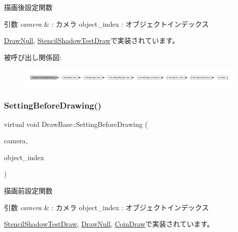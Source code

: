 描画後設定関数 


\begin{DoxyParams}{引数}
{\em camera} & \+: カメラ object\+\_\+index \+: オブジェクトインデックス \\
\hline
\end{DoxyParams}


\mbox{\hyperlink{class_draw_null_a76edfc5af0bf3275f96f40394aff8510}{Draw\+Null}}, \mbox{\hyperlink{class_stencil_shadow_test_draw_a68917115d3f151ed91ce297924ee5bbb}{Stencil\+Shadow\+Test\+Draw}}で実装されています。

被呼び出し関係図\+:
\nopagebreak
\begin{figure}[H]
\begin{center}
\leavevmode
\includegraphics[width=350pt]{class_draw_base_afe64f27b0bbf8c45da7aa0de4c3f3d65_icgraph}
\end{center}
\end{figure}
\mbox{\label{class_draw_base_a3978252914ddde12197ea4577356bf25}} 
\subsubsection{\texorpdfstring{Setting\+Before\+Drawing()}{SettingBeforeDrawing()}}
{\footnotesize\ttfamily virtual void Draw\+Base\+::\+Setting\+Before\+Drawing (\begin{DoxyParamCaption}\item[{\mbox{\hyperlink{class_camera}{Camera}} $\ast$}]{camera,  }\item[{unsigned}]{object\+\_\+index }\end{DoxyParamCaption})\hspace{0.3cm}{\ttfamily [pure virtual]}}



描画前設定関数 


\begin{DoxyParams}{引数}
{\em camera} & \+: カメラ object\+\_\+index \+: オブジェクトインデックス \\
\hline
\end{DoxyParams}


\mbox{\hyperlink{class_stencil_shadow_test_draw_a0f697b6dad67048c7f8916a53cca6b1c}{Stencil\+Shadow\+Test\+Draw}}, \mbox{\hyperlink{class_draw_null_a7f0d52c5c2fb2d9b8eb423f363862290}{Draw\+Null}}, \mbox{\hyperlink{class_coin_draw_a66c03acd675ac1820977cb21015abfdb}{Coin\+Draw}}で実装されています。

